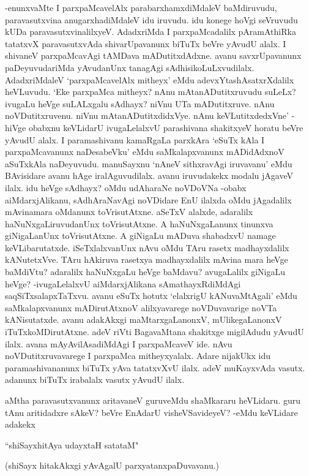 -enunxvaMte I parxpaMcavelAlx parabarxhamxdiMdaleV baMdiruvudu, paravasutxvina anugarxhadiMdaleV idu iruvudu. idu konege hoVgi seVruvudu kUDa paravasutxvinalilxyeV. AdadxriMda I parxpaMcadalilx pAramAthiRka tatatxvX paravasutxvAda shivarUpavanunx biTuTx beVre yAvudU alalx. I shivaneV parxpaMcavAgi tAMDava mADutitxdAdxne. avanu savxrUpavanunx paDeyuvudariMda yAvudanUnx tanagAgi sAdhisikoLuLxvudilalx. AdadxriMdaleV `parxpaMcavelAlx mitheyx' eMdu adevxYtashAsatxrXdalilx heVLuvudu. `Eke parxpaMca mitheyx? nAnu mAtanADutitxruvudu suLeLx? ivugaLu heVge suLALxgalu sAdhayx? niVnu UTa mADutitxruve. nAnu noVDutitxruvenu. niVnu mAtanADutitxdidxVye. nAnu keVLutitxdedxVne' -hiVge obabxnu keVLidarU ivugaLelalxvU parashivana shakitxyeV horatu beVre yAvudU alalx. I paramashivanu kamaRgaLa parxkAra `eSuTx kAla I parxpaMcavanunx naDesabeVku' eMdu saMkalapxvanunx mADidAdxnoV aSuTxkAla naDeyuvudu. manuSayxnu `nAneV sithxravAgi iruvavanu' eMdu BAvisidare avanu hAge iralAguvudilalx. avanu iruvudakekx modalu jAgaveV ilalx. idu heVge sAdhayx? oMdu udAharaNe noVDoVNa -obabx aiMdarxjAlikanu, sAdhAraNavAgi noVDidare EnU ilalxda oMdu jAgadalilx mAvinamara oMdanunx toVrisutAtxne. aSeTxV alalxde, adaralilx haNuNxgaLiruvudanUnx toVrisutAtxne. A haNuNxgaLanunx tinunxva giNigaLanUnx toVrisutAtxne. A giNigaLu mADuva shabadxvU namage keVLibarutatxde. iSeTxlalxvanUnx nAvu oMdu TAru rasetx madhayxdalilx kANutetxVve. TAru hAkiruva rasetxya madhayxdalilx mAvina mara heVge baMdiVtu? adaralilx haNuNxgaLu heVge baMdavu? avugaLalilx giNigaLu heVge? -ivugaLelalxvU aiMdarxjAlikana sAmathayxRdiMdAgi saqSiTxsalapxTaTxvu. avanu eSuTx hotutx `elalxrigU kANuvaMtAgali' eMdu saMkalapxvanunx mADirutAtxnoV alilxyavarege noVDuvavarige noVTa kANisutatxde. avanu adakAkxgi maMtarxgaLanonxV, mUlikegaLanonxV iTuTxkoMDirutAtxne. adeV riVti BagavaMtana shakitxge migilAdudu yAvudU ilalx. avana mAyAvilAsadiMdAgi I parxpaMcaveV ide. nAvu noVDutitxruvavarege I parxpaMca mitheyxyalalx. Adare nijakUkx idu paramashivananunx biTuTx yAva tatatxvXvU ilalx. adeV muKayxvAda vasutx. adanunx biTuTx irabalalx vasutx yAvudU ilalx. 

aMtha paravasutxvanunx aritavaneV guruveMdu shaMkararu heVLidaru. guru tAnu aritidadxre sAkeV? beVre EnAdarU visheVSavideyeV? -eMdu keVLidare adakekx 

\begin{shloka}
``shiSayxhitAya udayxtaH satataM"
\end{shloka}

(shiSayx hitakAkxgi yAvAgalU parxyatanxpaDuvavanu.)

